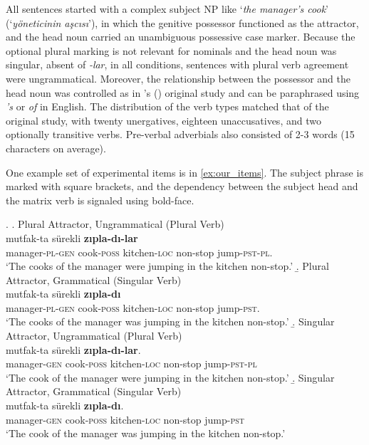 \documentclass[times,linguex]{glossa}\usepackage[]{graphicx}\usepackage[]{color}
\begin{document}
All sentences started with a complex subject NP like `\textit{the manager's cook}' (`\textit{yöneticinin aşcısı}'), in which the genitive possessor functioned as the attractor, and the head noun carried an unambiguous possessive case marker. Because the optional plural marking is not relevant for nominals and the head noun was singular, absent of \textit{-lar}, in all conditions, sentences with plural verb agreement were ungrammatical. Moreover, the relationship between the possessor and the head noun was controlled as in \citeauthor{LagoEtAl:2018}'s (\citeyear{LagoEtAl:2018}) original study and can be paraphrased using \textit{'s} or \textit{of} in English. The distribution of the verb types matched that of the original study, with twenty unergatives, eighteen unaccusatives, and two optionally transitive verbs. Pre-verbal adverbials also consisted of 2-3 words (15 characters on average).

One example set of experimental items is in \ref{ex:our_items}. The subject phrase is marked with square brackets, and the dependency between the subject head and the matrix verb is signaled using bold-face.


\ex. \label{ex:our_items}
  \a. Plural Attractor, Ungrammatical (Plural Verb) \label{ex:expitem-plpl}\\
   mutfak-ta sürekli \textbf{zıpla-dı-lar}\\ 
  manager-\textsc{pl}-\textsc{gen}  cook-\textsc{poss} kitchen-\textsc{loc} non-stop  jump-\textsc{pst}-\textsc{pl}.\\
  \glt `The cooks of the manager were jumping in the kitchen non-stop.'
  \b. Plural Attractor, Grammatical (Singular Verb) \label{ex:expitem-plsg} \\
   mutfak-ta sürekli \textbf{zıpla-dı}\\ 
  manager-\textsc{pl}-\textsc{gen}  cook-\textsc{poss} kitchen-\textsc{loc} non-stop  jump-\textsc{pst}.\\
  \glt `The cooks of the manager was jumping in the kitchen non-stop.'
  \b. Singular Attractor, Ungrammatical (Plural Verb) \label{ex:expitem-sgpl}\\
   mutfak-ta sürekli \textbf{zıpla-dı-lar}.\\ 
  manager-\textsc{gen}  cook-\textsc{poss} kitchen-\textsc{loc} non-stop  jump-\textsc{pst}-\textsc{pl}\\
  \glt `The cook of the manager were jumping in the kitchen non-stop.'
  \b. Singular Attractor, Grammatical (Singular Verb) \label{ex:expitem-sgsg}\\
   mutfak-ta sürekli \textbf{zıpla-dı}. \\ 
  manager-\textsc{gen}  cook-\textsc{poss} kitchen-\textsc{loc} non-stop  jump-\textsc{pst}\\
  \glt `The cook of the manager was jumping in the kitchen non-stop.'
  
\end{document}
